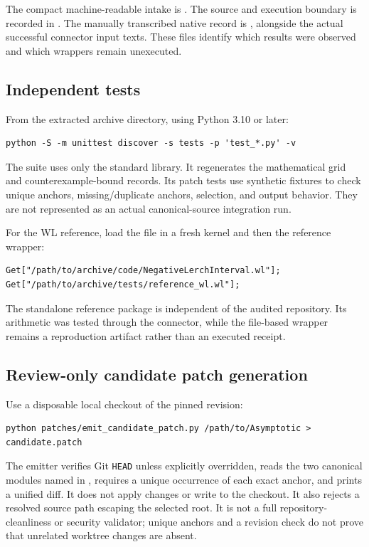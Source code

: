 \documentclass[11pt,a4paper]{article}
\begin{document}
The compact machine-readable intake is . The source and execution boundary is recorded in . The manually transcribed native record is , alongside the actual successful connector input texts. These files identify which results were observed and which wrappers remain unexecuted.

\subsection{Independent tests}
From the extracted archive directory, using Python 3.10 or later:
\begin{lstlisting}
python -S -m unittest discover -s tests -p 'test_*.py' -v
\end{lstlisting}
The suite uses only the standard library. It regenerates the mathematical grid and counterexample-bound records. Its patch tests use synthetic fixtures to check unique anchors, missing/duplicate anchors, selection, and output behavior. They are not represented as an actual canonical-source integration run.

For the WL reference, load the file in a fresh kernel and then the reference wrapper:
\begin{lstlisting}
Get["/path/to/archive/code/NegativeLerchInterval.wl"];
Get["/path/to/archive/tests/reference_wl.wl"];
\end{lstlisting}
The standalone reference package is independent of the audited repository. Its arithmetic was tested through the connector, while the file-based wrapper remains a reproduction artifact rather than an executed receipt.

\subsection{Review-only candidate patch generation}
Use a disposable local checkout of the pinned revision:
\begin{lstlisting}
python patches/emit_candidate_patch.py /path/to/Asymptotic > candidate.patch
\end{lstlisting}
The emitter verifies Git \texttt{HEAD} unless explicitly overridden, reads the two canonical modules named in , requires a unique occurrence of each exact anchor, and prints a unified diff. It does not apply changes or write to the checkout. It also rejects a resolved source path escaping the selected root. It is not a full repository-cleanliness or security validator; unique anchors and a revision check do not prove that unrelated worktree changes are absent.
\end{document}
